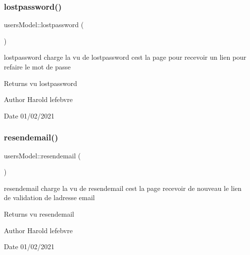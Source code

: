 \subsubsection{\texorpdfstring{lostpassword()}{lostpassword()}}
{\footnotesize\ttfamily users\+Model\+::lostpassword (\begin{DoxyParamCaption}{ }\end{DoxyParamCaption})}



lostpassword charge la vu de lostpassword c\textquotesingle{}est la page pour recevoir un lien pour refaire le mot de passe 

\begin{DoxyReturn}{Returns}
vu lostpassword 
\end{DoxyReturn}
\begin{DoxyAuthor}{Author}
Harold lefebvre 
\end{DoxyAuthor}
\begin{DoxyDate}{Date}
01/02/2021 
\end{DoxyDate}
\mbox{\label{classusers_model_ad1f92d2e00bad5dd71aa5e56f5f49487}} 
\subsubsection{\texorpdfstring{resendemail()}{resendemail()}}
{\footnotesize\ttfamily users\+Model\+::resendemail (\begin{DoxyParamCaption}{ }\end{DoxyParamCaption})}



resendemail charge la vu de resendemail c\textquotesingle{}est la page recevoir de nouveau le lien de validation de l\textquotesingle{}adresse email 

\begin{DoxyReturn}{Returns}
vu resendemail 
\end{DoxyReturn}
\begin{DoxyAuthor}{Author}
Harold lefebvre 
\end{DoxyAuthor}
\begin{DoxyDate}{Date}
01/02/2021 
\end{DoxyDate}
\mbox{\label{classusers_model_a0a9b6a319a05c1210cd6a4d535b5a659}} 
